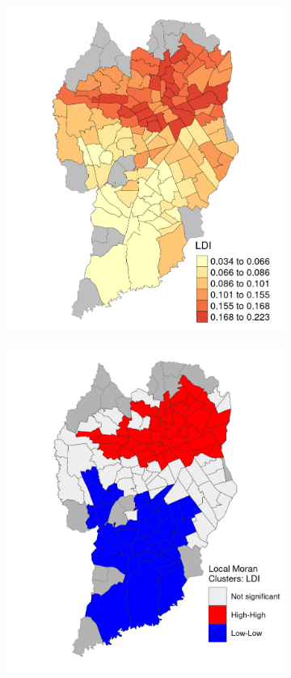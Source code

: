 \begin{figure}[!htbp]
    \centering\footnotesize
    \captionsetup{font=footnotesize}
    \caption{LDI COEFFICIENT ESTIMATES}
    \begin{subfigure}{0.5\textwidth}
        \includegraphics{fig/LDI.png}
    \end{subfigure}%
    \begin{subfigure}{0.5\textwidth}
        \includegraphics{fig/lisa_LDI.png}

\end{subfigure}
\end{figure}
